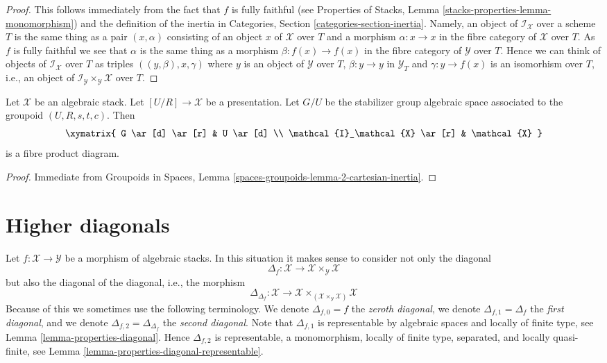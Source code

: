\begin{proof}
This follows immediately from the fact that $f$ is fully faithful (see
Properties of Stacks, Lemma \ref{stacks-properties-lemma-monomorphism})
and the definition of the inertia in
Categories, Section \ref{categories-section-inertia}.
Namely, an object of $\mathcal{I}_\mathcal{X}$ over a scheme $T$ is
the same thing as a pair $(x, \alpha)$ consisting of an object
$x$ of $\mathcal{X}$ over $T$ and a morphism $\alpha : x \to x$ in
the fibre category of $\mathcal{X}$ over $T$. As $f$ is fully faithful
we see that $\alpha$ is the same thing as a morphism
$\beta : f(x) \to f(x)$ in the fibre category of $\mathcal{Y}$ over $T$.
Hence we can think of objects of $\mathcal{I}_\mathcal{X}$ over $T$
as triples $((y, \beta), x, \gamma)$ where $y$ is an object of
$\mathcal{Y}$ over $T$, $\beta : y \to y$ in $\mathcal{Y}_T$ and
$\gamma : y \to f(x)$ is an isomorhism over $T$, i.e., an object
of $\mathcal{I}_\mathcal{Y} \times_\mathcal{Y} \mathcal{X}$ over $T$.
\end{proof}

\begin{lemma}
\label{lemma-presentation-inertia}
Let $\mathcal{X}$ be an algebraic stack. Let $[U/R] \to \mathcal{X}$
be a presentation. Let $G/U$ be the stabilizer group algebraic space
associated to the groupoid $(U, R, s, t, c)$. Then
$$
\xymatrix{
G \ar[d] \ar[r] & U \ar[d] \\
\mathcal{I}_\mathcal{X} \ar[r] & \mathcal{X}
}
$$
is a fibre product diagram.
\end{lemma}

\begin{proof}
Immediate from
Groupoids in Spaces, Lemma \ref{spaces-groupoids-lemma-2-cartesian-inertia}.
\end{proof}









\section{Higher diagonals}
\label{section-higher-diagonals}

\noindent
Let $f : \mathcal{X} \to \mathcal{Y}$ be a morphism of algebraic stacks.
In this situation it makes sense to consider not only the diagonal
$$
\Delta_f : \mathcal{X} \to \mathcal{X} \times_\mathcal{Y} \mathcal{X}
$$
but also the diagonal of the diagonal, i.e., the morphism
$$
\Delta_{\Delta_f} :
\mathcal{X}
\longrightarrow
\mathcal{X} \times_{(\mathcal{X} \times_\mathcal{Y} \mathcal{X})} \mathcal{X}
$$
Because of this we sometimes use the following terminology. We denote
$\Delta_{f, 0} = f$ the {\it zeroth diagonal},
we denote $\Delta_{f, 1} = \Delta_f$ the {\it first diagonal}, and
we denote $\Delta_{f, 2} = \Delta_{\Delta_f}$ the {\it second diagonal}.
Note that $\Delta_{f, 1}$ is representable by algebraic spaces and locally of
finite type, see
Lemma \ref{lemma-properties-diagonal}.
Hence $\Delta_{f, 2}$ is representable, a monomorphism, locally of finite type,
separated, and locally quasi-finite, see
Lemma \ref{lemma-properties-diagonal-representable}.

